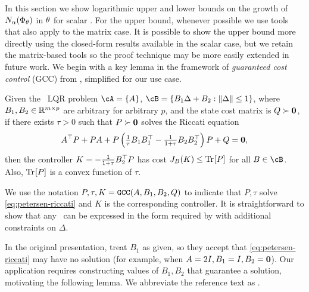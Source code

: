 \label{sec:results-scalar}


In this section we show logarithmic upper and lower bounds on
the growth of $N_{\alpha}(\Phi_\theta)$ in $\theta$
for scalar \DDFproblems.
For the upper bound, whenever possible we use tools that also apply to the matrix case.
It is possible to show the upper bound more directly using the closed-form results
available in the scalar case,
but we retain the matrix-based tools so the proof technique may be more easily extended in future work.
We begin with a key lemma in the framework of
\emph{guaranteed cost control} (GCC)
from \citet{petersen-guaranteed-cost},
simplified for our use case.

\begin{lemma}
\label{lem:petersen-gcc}
	Given the \multienv\ LQR problem
		$\cA = \{ A \}$,
		$\cB = \{ B_1 \Delta + B_2 : \norm{\Delta} \leq 1 \}$,
	where $B_1, B_2 \in \mathbb{R}^{m \times p}$ are arbitrary for arbitrary $p$,
	and the state cost matrix is $Q \succ \mathbf{0}$,
	if there exists $\tau > 0$ such that $P \succ \mathbf{0}$ solves the Riccati equation
	\begin{equation}
	\label{eq:petersen-riccati}
		A^\top P + P A
		+ P \left(
			\textstyle \frac{1}{\tau} B_1 B_1^\top - \frac{1}{1+\tau} B_2 B_2^\top
		\right) P
		+ Q = \mathbf{0},
	\end{equation}
	then the controller
	\(
		K = -\frac{1}{1 + \tau} B_2^\top P
	\)
	has cost $J_B(K) \leq \mathrm{Tr} \hspace{-1pt} \left[ P \right]$
	for all $B \in \cB$.
	Also, $\mathrm{Tr} \hspace{-1pt} \left[ P \right]$ is a convex function of $\tau$.
\end{lemma}



We use the notation
\(
	P, \tau, K = {\normalfont \texttt{GCC}}(A, B_1, B_2, Q)
\)
to indicate that $P, \tau$ solve
\eqref{eq:petersen-riccati}
and $K$ is the corresponding controller.
It is straightforward to show that any \DDFproblem\
can be expressed in the form required by 
with additional constraints on $\Delta$.

In the original presentation, \citet{petersen-guaranteed-cost} treat $B_1$ as given,
so they accept that
\eqref{eq:petersen-riccati} may have no solution
(for example, when $A = 2I, B_1 = I, B_2 = \mathbf{0}$).
Our application requires constructing values of $B_1, B_2$ that guarantee a solution,
motivating the following lemma.
We abbreviate the reference text \citet{lancaster-AREs} as .




